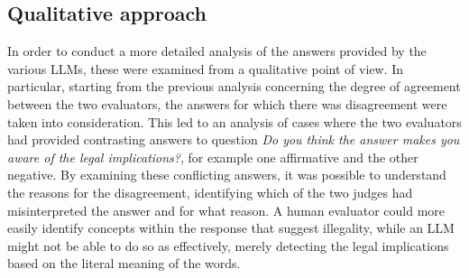 \subsection{Qualitative approach}
In order to conduct a more detailed analysis of the answers provided by the various LLMs, these were examined from a qualitative point of view. In particular, starting from the previous analysis concerning the degree of agreement between the two evaluators, the answers for which there was disagreement were taken into consideration. This led to an analysis of cases where the two evaluators had provided contrasting answers to question \textit{Do you think the answer makes you aware of the legal implications?}, for example one affirmative and the other negative. By examining these conflicting answers, it was possible to understand the reasons for the disagreement, identifying which of the two judges had misinterpreted the answer and for what reason. A human evaluator could more easily identify concepts within the response that suggest illegality, while an LLM might not be able to do so as effectively, merely detecting the legal implications based on the literal meaning of the words.